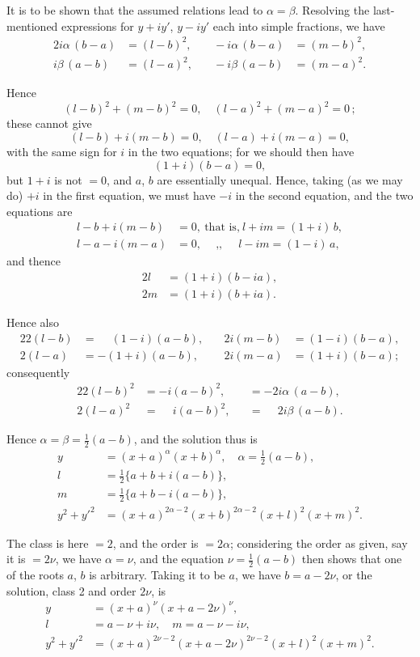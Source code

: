 \documentclass[11pt,a4paper]{book}
\begin{document}
It is to be shown that the assumed relations lead to $\alpha = \beta$. Resolving the last-mentioned expressions for $y+iy'$, $y-iy'$ each into simple fractions, we have
\begin{alignat*}{2}
i\alpha\, (b-a) &= (l-b)^2, &\quad -i\alpha\, (b-a) &= (m-b)^2, \\
i\beta\, (a-b) &= (l-a)^2, &\quad -i\beta\, (a-b) &= (m-a)^2.
\end{alignat*}

Hence
\[ (l-b)^2 + (m-b)^2 = 0,\quad (l-a)^2 + (m-a)^2 = 0\,; \]
these cannot give
\[ (l-b) + i(m-b) = 0,\quad (l-a) + i(m-a) = 0, \]
with the same sign for $i$ in the two equations; for we should then have
\[ (1+i)(b-a) = 0, \]
but $1+i$ is not $=0$, and $a$, $b$ are essentially unequal. Hence, taking (as we may do) $+i$ in the first equation, we must have $-i$ in the second equation, and the two equations are
\begin{align*}
l - b + i(m-b) &= 0,\ \text{that is,}\ l + im = (1+i)\, b, \\
l - a - i(m-a) &= 0,\ \quad \text{,,}\ \quad\ l - im = (1-i)\, a,
\end{align*}
and thence
\begin{align*}
2l\, &= (1+i)(b - ia), \\
2m &= (1+i)(b + ia).
\end{align*}

Hence also
\begin{alignat*}{2}
2(l-b) &= \phantom{-}(1-i)(a-b), &\quad 2i(m-b) &= (1-i)(b-a), \\
2(l-a) &= -(1+i)(a-b), &\quad 2i(m-a) &= (1+i)(b-a);
\end{alignat*}
consequently
\begin{alignat*}{2}
2(l-b)^2 &= -i(a-b)^2, &&= -2i\alpha\, (a-b), \\
2(l-a)^2 &= \phantom{-}i(a-b)^2, &&= \phantom{-}2i\beta\, (a-b).
\end{alignat*}

Hence $\alpha = \beta = \tfrac12(a-b)$, and the solution thus is
\begin{align*}
y &= (x+a)^{\alpha} (x+b)^{\alpha},\quad \alpha = \tfrac12(a-b), \\
l &= \tfrac12\{a+b+i(a-b)\}, \\
m &= \tfrac12\{a+b-i(a-b)\}, \\
y^2 + y'^2 &= (x+a)^{2\alpha-2} (x+b)^{2\alpha-2} (x+l)^2 (x+m)^2.
\end{align*}

The class is here $=2$, and the order is $=2\alpha$; considering the order as given, say it is $=2\nu$, we have $\alpha = \nu$, and the equation $\nu = \tfrac12(a-b)$ then shows that one of the roots $a$, $b$ is arbitrary. Taking it to be $a$, we have $b = a - 2\nu$, or the solution, class 2 and order $2\nu$, is
\begin{align*}
y &= (x+a)^{\nu} (x+a-2\nu)^{\nu}, \\
l &= a - \nu + i\nu,\quad m = a - \nu - i\nu, \\
y^2 + y'^2 &= (x+a)^{2\nu-2} (x+a-2\nu)^{2\nu-2} (x+l)^2 (x+m)^2.
\end{align*}
\end{document}
